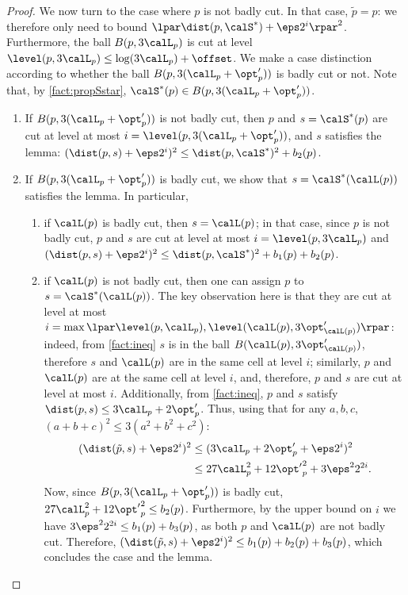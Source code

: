 \begin{proof}
 
 We now turn to the case where $p$ is not badly cut. In that case, $\tilde p = p$: we therefore only need to bound $\lpar \dist( p, \calS^*) + \eps 2^i\rpar^2$. 
 Furthermore, the ball $B(p, 3\calL_p)$ is cut at level $\level(p, 3\calL_p) \leq \log(3\calL_p)+\offset$. 
We make a case distinction according to whether the ball $B(p, 3(\calL_p + \opt'_p))$  is badly cut or not. Note that, by \cref{fact:propSstar}, $ \calS^*(p) \in B(p, 3(\calL_p + \opt'_p))$.
 \begin{enumerate}
  \item If $B(p, 3(\calL_p + \opt'_p))$ is not badly cut, then $p$ and $s = \calS^*(p)$ are cut at level at most $i = \level(p, 3(\calL_p + \opt'_p))$, and $s$ satisfies the lemma: $(\dist(p, s) + \eps 2^i)^2 \leq \dist(p, \calS^*)^2 + b_2(p)$.
  \item If $B(p, 3(\calL_p + \opt'_p))$ is badly cut, we show that $s= \calS^*(\calL(p))$ satisfies the lemma. In particular,
  \begin{enumerate}
      \item if $\calL(p)$ is badly cut, then $s = \calL(p)$; in that case, since $p$ is not badly cut, $p$ and $s$ are cut at level at most $i = \level(p, 3\calL_p)$ and $(\dist(p, s) + \eps 2^i)^2 \leq \dist(p, \calS^*)^2 + b_1(p) + b_2(p)$.
      \item if $\calL(p)$ is not badly cut, then one can assign $p$ to $s=\calS^*(\calL(p))$. The key observation here is that they are cut at level at most $i = \max\lpar \level(p, \calL_p), \level(\calL(p),  3\opt'_{\calL(p)}) \rpar$: indeed, from \cref{fact:ineq} $s$ is in the ball $B(\calL(p), 3\opt'_{\calL(p)})$, therefore $s$ and $\calL(p)$ are in the same cell at level $i$; similarly, $p$ and $\calL(p)$ are at the same cell at level $i$, and, therefore, $p$ and $s$ are cut at level at most $i$.  Additionally, from \cref{fact:ineq}, $p$ and $s$ satisfy $\dist(p, s) \leq 3\calL_p + 2\opt'_p$.    
 Thus, using that for any $a, b, c$, $(a+b+c)^2 \leq 3(a^2 + b^2 + c^2)$:
       \begin{align*}
           (\dist(\tilde p, s) + \eps 2^i)^2 &\leq 
           (3\calL_p + 2\opt'_p + \eps 2^i)^2\\
           &\leq 27 \calL_p^2 + 12 {\opt'}_p^2 + 3\eps^2 2^{2i}.
       \end{align*}
    Now, since $B(p, 3(\calL_p + \opt'_p))$ is badly cut, $27 \calL_p^2 + 12 {\opt'}_p^2 \leq b_2(p)$. Furthermore, by the upper bound on $i$ we have $3\eps^2 2^{2i} \leq b_1(p) + b_3(p)$, as both $p$ and $\calL(p)$ are not badly cut. 
    Therefore, $(\dist(\tilde p, s) + \eps 2^i)^2 \leq b_1(p)+ b_2(p) + b_3(p)$, which concludes the case and the lemma.\qedhere
  \end{enumerate}
\end{enumerate}
%
\end{proof}

